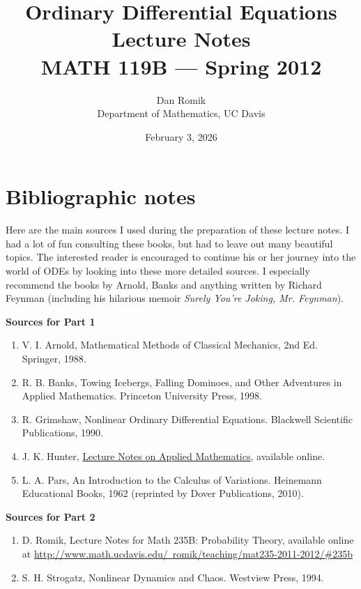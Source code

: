 \documentclass[11pt]{report}
\title{Ordinary Differential Equations Lecture Notes \\ MATH 119B --- Spring 2012}
\author{Dan Romik \\ Department of Mathematics, UC Davis}
\date{February 3, 2026}
\theoremstyle{plain}
\theoremstyle{definition}
\begin{document}
\maketitle
{}
\tableofcontents

\chapter*{Bibliographic notes}
Here are the main sources I used during the
preparation of these lecture notes. I had a lot of fun
consulting these books, but had to leave out many
beautiful topics. The interested reader is encouraged
to continue his or her journey into the world of ODEs
by looking into these more detailed sources. I
especially recommend the books by Arnold, Banks and
anything written by Richard Feynman (including his
hilarious memoir \emph{Surely You're Joking, Mr. Feynman}).

\textbf{Sources for Part 1}

\begin{enumerate}[label=\arabic*.]
\item V. I. Arnold, Mathematical Methods of Classical
Mechanics, 2nd Ed. Springer, 1988.

\item R. B. Banks, Towing Icebergs, Falling Dominoes, and
Other Adventures in Applied Mathematics. Princeton
University Press, 1998.

\item R. Grimshaw, Nonlinear Ordinary Differential
Equations. Blackwell Scientific Publications, 1990.

\item J. K. Hunter, \href{http://www.math.ucdavis.edu/~hunter/m280_09/applied_math.html}{Lecture Notes on Applied
Mathematics},
available online.

\item L. A. Pars, An Introduction to the Calculus of
Variations. Heinemann Educational Books, 1962
(reprinted by Dover Publications, 2010).
\end{enumerate}

\textbf{Sources for Part 2}

\begin{enumerate}[label=\arabic*., start=6]
\item D. Romik, Lecture Notes for Math 235B: Probability
Theory, available online at
\href{http://www.math.ucdavis.edu/~romik/teaching/mat235-2011-2012/\#235b}{http://www.math.ucdavis.edu/~romik/teaching/mat235-2011-2012/\#235b}

\item S. H. Strogatz, Nonlinear Dynamics and Chaos.
Westview Press, 1994.
\end{enumerate}
\end{document}
